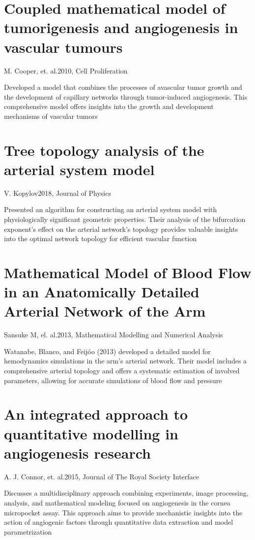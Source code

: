 \section{Coupled mathematical model of tumorigenesis and angiogenesis in vascular tumours}{M. Cooper, et. al.}{2010, Cell Proliferation}

Developed a model that combines the processes of avascular tumor growth and the development of capillary networks through tumor-induced angiogenesis. This comprehensive model offers insights into the growth and development mechanisms of vascular tumors \cite{Cooper2010}

\section{Tree topology analysis of the arterial system model}{V. Kopylov}{2018, Journal of Physics}

Presented an algorithm for constructing an arterial system model with physiologically significant geometric properties. Their analysis of the bifurcation exponent's effect on the arterial network's topology provides valuable insights into the optimal network topology for efficient vascular function  \cite{Kopylova2018}

\section{Mathematical Model of Blood Flow in an Anatomically Detailed Arterial Network of the Arm}{Sansuke M, el. al.}{2013, Mathematical Modelling and Numerical Analysis}

Watanabe, Blanco, and Feijóo (2013) developed a detailed model for hemodynamics simulations in the arm's arterial network. Their model includes a comprehensive arterial topology and offers a systematic estimation of involved parameters, allowing for accurate simulations of blood flow and pressure \cite{Watanabe2013}


\section{An integrated approach to quantitative modelling in angiogenesis research}{A. J. Connor, et. al.}{2015, Journal of The Royal Society Interface}

Discusses a multidisciplinary approach combining experiments, image processing, analysis, and mathematical modeling focused on angiogenesis in the cornea micropocket assay. This approach aims to provide mechanistic insights into the action of angiogenic factors through quantitative data extraction and model parametrization \cite{Connor2015}



